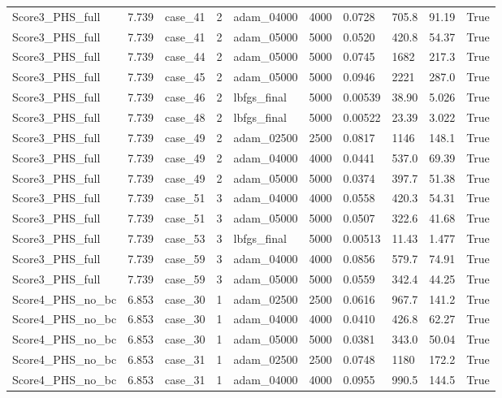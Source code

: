 \begin{longtable}{llllllllll}
Score3\_PHS\_full & 7.739 & case\_41 & 2 & adam\_04000 & 4000 & 0.0728 & 705.8 & 91.19 & True \\
Score3\_PHS\_full & 7.739 & case\_41 & 2 & adam\_05000 & 5000 & 0.0520 & 420.8 & 54.37 & True \\
Score3\_PHS\_full & 7.739 & case\_44 & 2 & adam\_05000 & 5000 & 0.0745 & 1682 & 217.3 & True \\
Score3\_PHS\_full & 7.739 & case\_45 & 2 & adam\_05000 & 5000 & 0.0946 & 2221 & 287.0 & True \\
Score3\_PHS\_full & 7.739 & case\_46 & 2 & lbfgs\_final & 5000 & 0.00539 & 38.90 & 5.026 & True \\
Score3\_PHS\_full & 7.739 & case\_48 & 2 & lbfgs\_final & 5000 & 0.00522 & 23.39 & 3.022 & True \\
Score3\_PHS\_full & 7.739 & case\_49 & 2 & adam\_02500 & 2500 & 0.0817 & 1146 & 148.1 & True \\
Score3\_PHS\_full & 7.739 & case\_49 & 2 & adam\_04000 & 4000 & 0.0441 & 537.0 & 69.39 & True \\
Score3\_PHS\_full & 7.739 & case\_49 & 2 & adam\_05000 & 5000 & 0.0374 & 397.7 & 51.38 & True \\
Score3\_PHS\_full & 7.739 & case\_51 & 3 & adam\_04000 & 4000 & 0.0558 & 420.3 & 54.31 & True \\
Score3\_PHS\_full & 7.739 & case\_51 & 3 & adam\_05000 & 5000 & 0.0507 & 322.6 & 41.68 & True \\
Score3\_PHS\_full & 7.739 & case\_53 & 3 & lbfgs\_final & 5000 & 0.00513 & 11.43 & 1.477 & True \\
Score3\_PHS\_full & 7.739 & case\_59 & 3 & adam\_04000 & 4000 & 0.0856 & 579.7 & 74.91 & True \\
Score3\_PHS\_full & 7.739 & case\_59 & 3 & adam\_05000 & 5000 & 0.0559 & 342.4 & 44.25 & True \\
Score4\_PHS\_no\_bc & 6.853 & case\_30 & 1 & adam\_02500 & 2500 & 0.0616 & 967.7 & 141.2 & True \\
Score4\_PHS\_no\_bc & 6.853 & case\_30 & 1 & adam\_04000 & 4000 & 0.0410 & 426.8 & 62.27 & True \\
Score4\_PHS\_no\_bc & 6.853 & case\_30 & 1 & adam\_05000 & 5000 & 0.0381 & 343.0 & 50.04 & True \\
Score4\_PHS\_no\_bc & 6.853 & case\_31 & 1 & adam\_02500 & 2500 & 0.0748 & 1180 & 172.2 & True \\
Score4\_PHS\_no\_bc & 6.853 & case\_31 & 1 & adam\_04000 & 4000 & 0.0955 & 990.5 & 144.5 & True \\

\end{longtable}
